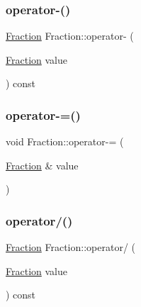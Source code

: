 \hypertarget{class_fraction_a3ab475288d23337521e46c849bd81a88}{}\label{class_fraction_a3ab475288d23337521e46c849bd81a88} 
\subsubsection{\texorpdfstring{operator-\/()}{operator-()}}
{\footnotesize\ttfamily \hyperlink{class_fraction}{Fraction} Fraction\+::operator-\/ (\begin{DoxyParamCaption}\item[{\hyperlink{class_fraction}{Fraction}}]{value }\end{DoxyParamCaption}) const}

\hypertarget{class_fraction_a560957bfe9353cfee0a6d30dbf66fb6f}{}\label{class_fraction_a560957bfe9353cfee0a6d30dbf66fb6f} 
\subsubsection{\texorpdfstring{operator-\/=()}{operator-=()}}
{\footnotesize\ttfamily void Fraction\+::operator-\/= (\begin{DoxyParamCaption}\item[{\hyperlink{class_fraction}{Fraction} \&}]{value }\end{DoxyParamCaption})}

\hypertarget{class_fraction_a60479946006e920343c3e03ce9f4f0f2}{}\label{class_fraction_a60479946006e920343c3e03ce9f4f0f2} 
\subsubsection{\texorpdfstring{operator/()}{operator/()}}
{\footnotesize\ttfamily \hyperlink{class_fraction}{Fraction} Fraction\+::operator/ (\begin{DoxyParamCaption}\item[{\hyperlink{class_fraction}{Fraction}}]{value }\end{DoxyParamCaption}) const}

\hypertarget{class_fraction_a4a70499be6c756cf4e0f3982bb2558df}{}\label{class_fraction_a4a70499be6c756cf4e0f3982bb2558df} 
